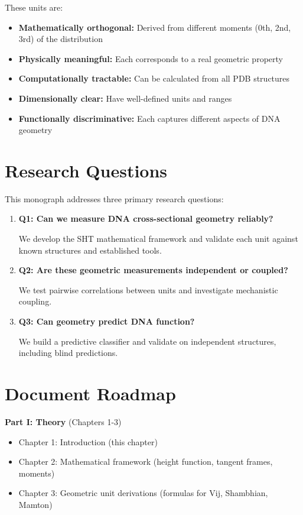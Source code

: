 These units are:

\begin{itemize}
    \item \textbf{Mathematically orthogonal:} Derived from different moments (0th, 2nd, 3rd) of the distribution
    \item \textbf{Physically meaningful:} Each corresponds to a real geometric property
    \item \textbf{Computationally tractable:} Can be calculated from all PDB structures
    \item \textbf{Dimensionally clear:} Have well-defined units and ranges
    \item \textbf{Functionally discriminative:} Each captures different aspects of DNA geometry
\end{itemize}

\section{Research Questions}

This monograph addresses three primary research questions:

\begin{enumerate}
    \item \textbf{Q1: Can we measure DNA cross-sectional geometry reliably?}
    
    We develop the SHT mathematical framework and validate each unit against known structures and established tools.
    
    \item \textbf{Q2: Are these geometric measurements independent or coupled?}
    
    We test pairwise correlations between units and investigate mechanistic coupling.
    
    \item \textbf{Q3: Can geometry predict DNA function?}
    
    We build a predictive classifier and validate on independent structures, including blind predictions.
\end{enumerate}

\section{Document Roadmap}

\textbf{Part I: Theory} (Chapters 1-3)
\begin{itemize}
    \item Chapter 1: Introduction (this chapter)
    \item Chapter 2: Mathematical framework (height function, tangent frames, moments)
    \item Chapter 3: Geometric unit derivations (formulas for Vij, Shambhian, Mamton)
\end{itemize}

